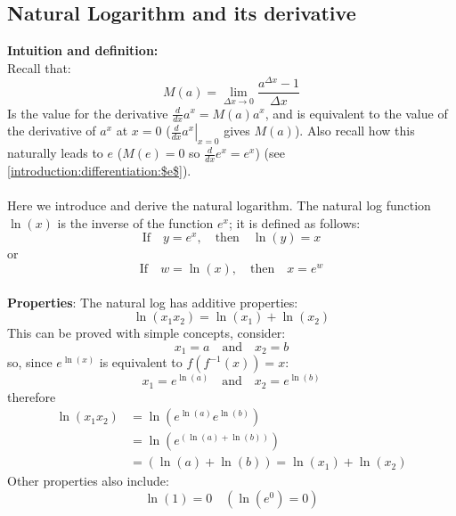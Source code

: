 \documentclass{report}
\begin{document}
\subsection{Natural Logarithm and its derivative} %
\textbf{Intuition and definition:}\\
Recall that:
\begin{equation*}
M(a)=\lim_{\Delta x\to0}\frac{a^{\Delta x}-1}{\Delta x}
\end{equation*}
Is the value for the derivative $\frac{d}{dx}a^x=M(a)a^x$, and is equivalent to the value of the
derivative of $a^x$ at $x=0$ ($\left.\frac{d}{dx}a^x\right|_{x=0}$ gives $M(a)$). Also recall
how this naturally leads to $e$ ($M(e)=0$ so $\frac{d}{dx}e^x=e^x$) 
(see \ref{introduction:differentiation:$e$}).\\
\vspace{1mm}\\
Here we introduce and derive the natural logarithm. The natural log function $\ln(x)$ is the 
inverse of the function $e^x$; it is defined as follows:
\begin{equation*}
\text{If}\quad y=e^x,\quad\text{then}\quad\ln(y)=x
\end{equation*}
or
\begin{equation*}
\text{If}\quad w=\ln(x),\quad\text{then}\quad x=e^w
\end{equation*}
\vspace{1mm}\\
\textbf{Properties}: The natural log has additive properties:
\begin{equation*}
\ln(x_1x_2)=\ln(x_1)+\ln(x_2)
\end{equation*}
This can be proved with simple concepts, consider:
\begin{equation*}
x_1=a\quad\text{and}\quad x_2=b
\end{equation*}
so, since $e^{\ln(x)}$ is equivalent to $f(f^{-1}(x))=x$: 
\begin{equation*}
x_1=e^{\ln(a)}\quad\text{and}\quad x_2=e^{\ln(b)}
\end{equation*}
therefore
\begin{align*}
\ln(x_1x_2)&=\ln(e^{\ln(a)}e^{\ln(b)})\\
&=\ln(e^{(\ln(a)+\ln(b))})\\
&=(\ln(a)+\ln(b))=\ln(x_1)+\ln(x_2)
\end{align*}
Other properties also include:
\begin{equation*}
\ln(1)=0\quad(\ln(e^0)=0)
\end{equation*}
\end{document}
